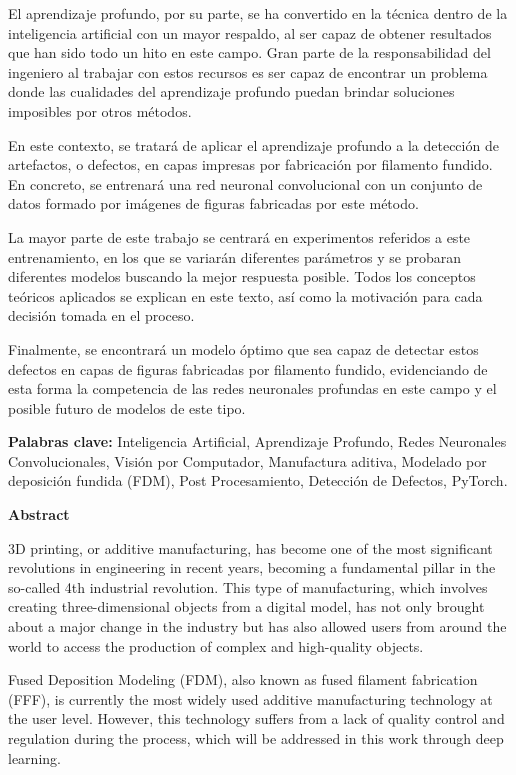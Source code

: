 \documentclass{report}
\begin{document}
El aprendizaje profundo, por su parte, se ha convertido en la técnica dentro de la inteligencia artificial con un mayor respaldo, al ser capaz de obtener resultados que han sido todo un hito en este campo. Gran parte de la responsabilidad del ingeniero al trabajar con estos recursos es ser capaz de encontrar un problema donde las cualidades del aprendizaje profundo puedan brindar soluciones imposibles por otros métodos.

En este contexto, se tratará de aplicar el aprendizaje profundo a la detección de artefactos, o defectos, en capas impresas por fabricación por filamento fundido. En concreto, se entrenará una red neuronal convolucional con un conjunto de datos formado por imágenes de figuras fabricadas por este método.

La mayor parte de este trabajo se centrará en experimentos referidos a este entrenamiento, en los que se variarán diferentes parámetros y se probaran diferentes modelos buscando la mejor respuesta posible. Todos los conceptos teóricos aplicados se explican en este texto, así como la motivación para cada decisión tomada en el proceso.

Finalmente, se encontrará un modelo óptimo que sea capaz de detectar estos defectos en capas de figuras fabricadas por filamento fundido, evidenciando de esta forma la competencia de las redes neuronales profundas en este campo y el posible futuro de modelos de este tipo.




\textbf{Palabras clave:} Inteligencia Artificial, Aprendizaje Profundo, Redes Neuronales Convolucionales, Visión por Computador, Manufactura aditiva, Modelado por deposición fundida (FDM), Post Procesamiento, Detección de Defectos, PyTorch.


\newpage
\thispagestyle{empty}
\begin{center}
    {\huge  \textbf{Abstract} \par}
\end{center}


3D printing, or additive manufacturing, has become one of the most significant revolutions in engineering in recent years, becoming a fundamental pillar in the so-called 4th industrial revolution. This type of manufacturing, which involves creating three-dimensional objects from a digital model, has not only brought about a major change in the industry but has also allowed users from around the world to access the production of complex and high-quality objects.

Fused Deposition Modeling (FDM), also known as fused filament fabrication (FFF), is currently the most widely used additive manufacturing technology at the user level. However, this technology suffers from a lack of quality control and regulation during the process, which will be addressed in this work through deep learning.
\end{document}
